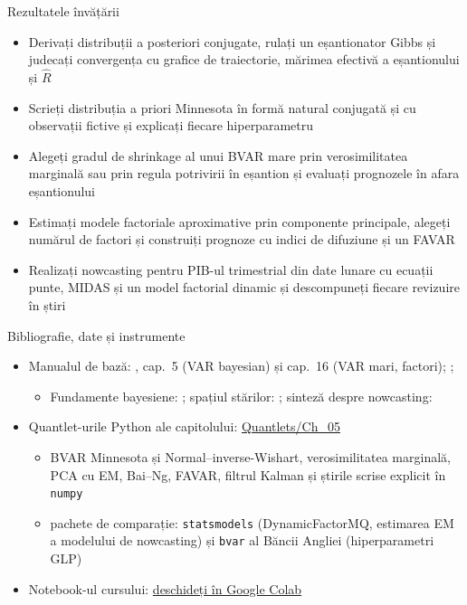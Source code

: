 \begin{frame}{Rezultatele învățării}
\itemsize{\small}
\begin{itemize}
    \item Derivați distribuții a posteriori conjugate, rulați un eșantionator Gibbs și judecați convergența cu grafice de traiectorie, mărimea efectivă a eșantionului și $\widehat R$
    \item Scrieți distribuția a priori Minnesota în formă natural conjugată și cu observații fictive și explicați fiecare hiperparametru
    \item Alegeți gradul de shrinkage al unui BVAR mare prin verosimilitatea marginală sau prin regula potrivirii în eșantion și evaluați prognozele în afara eșantionului
    \item Estimați modele factoriale aproximative prin componente principale, alegeți numărul de factori și construiți prognoze cu indici de difuziune și un FAVAR
    \item Realizați nowcasting pentru PIB-ul trimestrial din date lunare cu ecuații punte, MIDAS și un model factorial dinamic și descompuneți fiecare revizuire în știri
\end{itemize}
\end{frame}

\begin{frame}{Bibliografie, date și instrumente}
\itemsize{\small}
\begin{itemize}
    \item Manualul de bază: , cap.~5 (VAR bayesian) și cap.~16 (VAR mari, factori); ; 
    \begin{itemize}
        \item Fundamente bayesiene: ; spațiul stărilor: ; sinteză despre nowcasting: 
    \end{itemize}
    \item Quantlet-urile Python ale capitolului: \href{https://github.com/danpele/Advanced-Time-Series/tree/main/Quantlets/Ch_05}{Quantlets/Ch\_05}
    \begin{itemize}
        \item BVAR Minnesota și Normal--inverse-Wishart, verosimilitatea marginală, PCA cu EM, Bai--Ng, FAVAR, filtrul Kalman și știrile scrise explicit în \texttt{numpy}
        \item pachete de comparație: \texttt{statsmodels} (DynamicFactorMQ, estimarea EM a modelului de nowcasting) și \texttt{bvar} al Băncii Angliei (hiperparametri GLP)
    \end{itemize}
    \item Notebook-ul cursului: \href{\colaburl{notebooks/EN/chapter5_lecture_notebook.ipynb}}{deschideți în Google Colab}
\end{itemize}
\end{frame}

